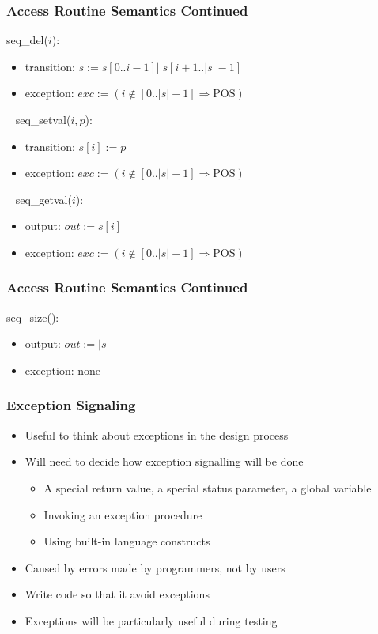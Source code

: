 \documentclass[t, 12pt, numbers, fleqn, handout]{beamer}
\begin{document}
\begin{frame}
\frametitle{Access Routine Semantics Continued}

\noindent seq\_del($i$):
\begin{itemize}
\item transition: $s := s[0..i-1] || s[i+1..|s|-1]$
\item exception:  $exc := (i \notin [0..|s|-1] \Rightarrow \mathrm{POS})$
\end{itemize}
~\newline
\noindent seq\_setval($i, p$):
\begin{itemize}
\item transition: $s[i] := p$
\item exception: $exc := (i \notin [0..|s|-1] \Rightarrow \mathrm{POS})$
\end{itemize}
~\newline
\noindent seq\_getval($i$):
\begin{itemize}
\item output: $out := s[i]$
\item exception: $exc := (i \notin [0..|s|-1] \Rightarrow \mathrm{POS})$
\end{itemize}

\end{frame}


\begin{frame}
\frametitle{Access Routine Semantics Continued}

\noindent seq\_size():
\begin{itemize}
\item output: $out := | s |$
\item exception: none
\end{itemize}

\end{frame}


\begin{frame}

\frametitle{Exception Signaling}

\begin{itemize}
\item Useful to think about exceptions in the design process
\item Will need to decide how exception signalling will be done
\begin{itemize}
\item A special return value, a special status parameter, a global variable
\item Invoking an exception procedure
\item Using built-in language constructs
\end{itemize}
\item Caused by errors made by programmers, not by users
\item Write code so that it avoid exceptions
\item Exceptions will be particularly useful during testing
\end{itemize}

\end{frame}
\end{document}
